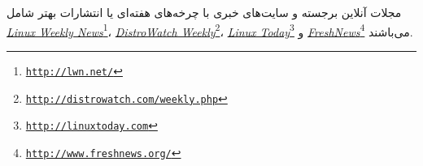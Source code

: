 
مجلات آنلاین برجسته و سایت‌های خبری با چرخه‌های هفته‌ای یا
انتشارات بهتر شامل
\emph{\url{Linux Weekly News}}\footnote{\texttt{\url{http://lwn.net/}}}،
\emph{\url{DistroWatch Weekly}}\footnote{\texttt{\url{http://distrowatch.com/weekly.php}}}،
\emph{\url{Linux Today}}\footnote{\texttt{\url{http://linuxtoday.com}}}
و
\emph{\url{FreshNews}}\footnote{\texttt{\url{http://www.freshnews.org/}}}
می‌باشند.

